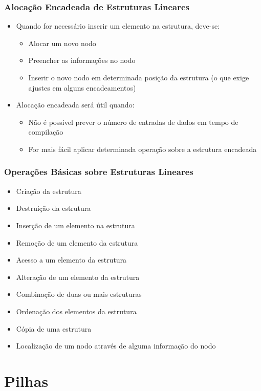 \documentclass[aspectratio=169]{beamer}
\begin{document}
\begin{frame}\frametitle{Alocação Encadeada de Estruturas Lineares}
\begin{itemize}
	\item Quando for necessário inserir um elemento na estrutura, deve-se:
	\begin{itemize}
		\item Alocar um novo nodo
		\item Preencher as informações no nodo
		\item Inserir o novo nodo em determinada posição da estrutura (o que exige ajustes em alguns encadeamentos)
	\end{itemize}
	\item Alocação encadeada será útil quando:
	\begin{itemize}
		\item Não é possível prever o número de entradas de dados em tempo de compilação
		\item For mais fácil aplicar determinada operação sobre a estrutura encadeada
	\end{itemize}
\end{itemize}
\end{frame}

\begin{frame}\frametitle{Operações Básicas sobre Estruturas Lineares}
\begin{itemize}
	\item Criação da estrutura
	\item Destruição da estrutura
	\item Inserção de um elemento na estrutura
	\item Remoção de um elemento da estrutura
	\item Acesso a um elemento da estrutura
	\item Alteração de um elemento da estrutura
	\item Combinação de duas ou mais estruturas
	\item Ordenação dos elementos da estrutura
	\item Cópia de uma estrutura
	\item Localização de um nodo através de alguma informação do nodo
\end{itemize}
\end{frame}

\section{Pilhas}
\end{document}
